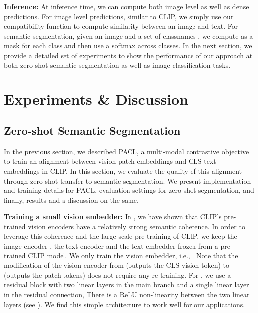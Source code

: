 \documentclass[10pt,twocolumn,letterpaper]{article}
\begin{document}
\textbf{Inference:} At inference time, we can compute both image level as well as dense predictions. For image level predictions, similar to CLIP, we simply use our compatibility function  to compute similarity between an image and text. For semantic segmentation, given an image  and a set of classnames , we compute  as a mask for each class and then use a softmax across classes. In the next section, we provide a detailed set of experiments to show the performance of our approach at both zero-shot semantic segmentation as well as image classification tasks.



\section{Experiments \& Discussion}

\subsection{Zero-shot Semantic Segmentation}
\label{sec:zeroshot_semantic_segmentation}

In the previous section, we described PACL, a multi-modal contrastive objective to train an alignment between vision patch embeddings and CLS text embeddings in CLIP. In this section, we evaluate the quality of this alignment through zero-shot transfer to semantic segmentation. We present implementation and training details for PACL, evaluation settings for zero-shot segmentation, and finally, results and a discussion on the same.

\textbf{Training a small vision embedder:} 
In , we have shown that CLIP's pre-trained vision encoders  have a relatively strong semantic coherence. In order to leverage this coherence and the large scale pre-training of CLIP, we keep the image encoder , the text encoder  and the text embedder  frozen from a pre-trained CLIP model. We only train the vision embedder, i.e., . Note that the modification of the vision encoder from  (outputs the CLS vision token) to  (outputs the patch tokens) does not require any re-training. For , we use a residual block with two linear layers in the main branch and a single linear layer in the residual connection, There is a ReLU non-linearity between the two linear layers (see ). We find this simple architecture to work well for our applications.
\end{document}
